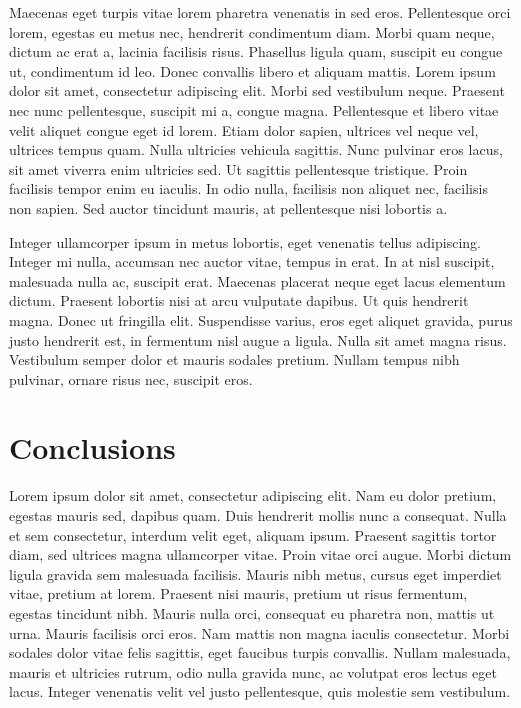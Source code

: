 \documentclass[manuscript]{geophysics}
\begin{document}
Maecenas eget turpis vitae lorem pharetra venenatis in sed eros. Pellentesque
orci lorem, egestas eu metus nec, hendrerit condimentum diam. Morbi quam neque,
dictum ac erat a, lacinia facilisis risus. Phasellus ligula quam, suscipit eu
congue ut, condimentum id leo. Donec convallis libero et aliquam mattis. Lorem
ipsum dolor sit amet, consectetur adipiscing elit. Morbi sed vestibulum neque.
Praesent nec nunc pellentesque, suscipit mi a, congue magna. Pellentesque et
libero vitae velit aliquet congue eget id lorem. Etiam dolor sapien, ultrices
vel neque vel, ultrices tempus quam. Nulla ultricies vehicula sagittis. Nunc
pulvinar eros lacus, sit amet viverra enim ultricies sed. Ut sagittis
pellentesque tristique. Proin facilisis tempor enim eu iaculis. In odio nulla,
facilisis non aliquet nec, facilisis non sapien. Sed auctor tincidunt mauris,
at pellentesque nisi lobortis a.

Integer ullamcorper ipsum in metus lobortis, eget venenatis tellus adipiscing.
Integer mi nulla, accumsan nec auctor vitae, tempus in erat. In at nisl
suscipit, malesuada nulla ac, suscipit erat. Maecenas placerat neque eget lacus
elementum dictum. Praesent lobortis nisi at arcu vulputate dapibus. Ut quis
hendrerit magna. Donec ut fringilla elit. Suspendisse varius, eros eget aliquet
gravida, purus justo hendrerit est, in fermentum nisl augue a ligula. Nulla sit
amet magna risus. Vestibulum semper dolor et mauris sodales pretium. Nullam
tempus nibh pulvinar, ornare risus nec, suscipit eros.

\section{Conclusions}

Lorem ipsum dolor sit amet, consectetur adipiscing elit. Nam eu dolor pretium,
egestas mauris sed, dapibus quam. Duis hendrerit mollis nunc a consequat. Nulla
et sem consectetur, interdum velit eget, aliquam ipsum. Praesent sagittis
tortor diam, sed ultrices magna ullamcorper vitae. Proin vitae orci augue.
Morbi dictum ligula gravida sem malesuada facilisis. Mauris nibh metus, cursus
eget imperdiet vitae, pretium at lorem. Praesent nisi mauris, pretium ut risus
fermentum, egestas tincidunt nibh. Mauris nulla orci, consequat eu pharetra
non, mattis ut urna. Mauris facilisis orci eros. Nam mattis non magna iaculis
consectetur. Morbi sodales dolor vitae felis sagittis, eget faucibus turpis
convallis. Nullam malesuada, mauris et ultricies rutrum, odio nulla gravida
nunc, ac volutpat eros lectus eget lacus. Integer venenatis velit vel justo
pellentesque, quis molestie sem vestibulum.
\end{document}
